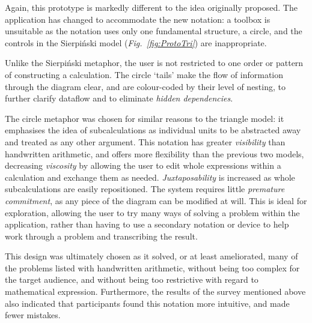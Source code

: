 \documentclass[12pt,twoside,notitlepage,xetex]{report}
\begin{document}
Again, this prototype is markedly different to the idea originally proposed.  The application has changed to accommodate the new notation: a toolbox is unsuitable as the notation uses only one fundamental structure, a circle, and the controls in the Sierpiński model (\emph{Fig.~\ref{fig:ProtoTri}}) are inappropriate.

Unlike the Sierpiński metaphor, the user is not restricted to one order or pattern of constructing a calculation.  The circle `tails' make the flow of information through the diagram clear, and are colour-coded by their level of nesting, to further clarify dataflow and to eliminate \emph{hidden dependencies}.

The circle metaphor was chosen for similar reasons to the triangle model: it emphasises the idea of subcalculations as individual units to be abstracted away and treated as any other argument.  This notation has greater \emph{visibility} than handwritten arithmetic, and offers more flexibility than the previous two models, decreasing \emph{viscosity} by allowing the user to edit whole expressions within a calculation and exchange them as needed.  \emph{Juxtaposability} is increased as whole subcalculations are easily repositioned.  The system requires little \emph{premature commitment}, as any piece of the diagram can be modified at will.  This is ideal for exploration, allowing the user to try many ways of solving a problem within the application, rather than having to use a secondary notation or device to help work through a problem and transcribing the result.

This design was ultimately chosen as it solved, or at least ameliorated, many of the problems listed with handwritten arithmetic, without being too complex for the target audience, and without being too restrictive with regard to mathematical expression.  Furthermore, the results of the survey mentioned above also indicated that participants found this notation more intuitive, and made fewer mistakes.



\end{document}
